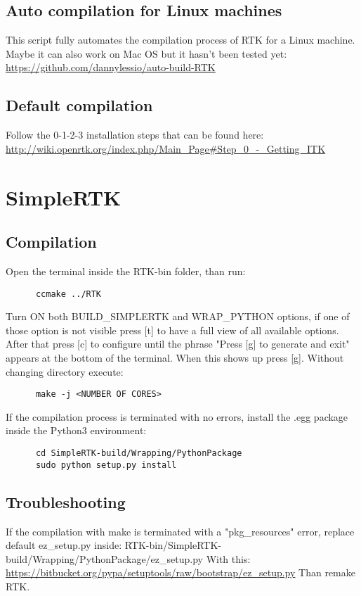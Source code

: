 \documentclass[a4paper,11pt, oneside]{article}
\begin{document}
    \subsection{  Auto compilation for Linux machines}
    
      \par This script fully automates the compilation process of RTK for a Linux machine. Maybe it can also work on Mac OS but it hasn't been tested yet:
    \newline
    \url{https://github.com/dannylessio/auto-build-RTK}
    
    \subsection{ Default compilation }
     Follow the 0-1-2-3 installation steps that can be found here:
    \newline
    \url{http://wiki.openrtk.org/index.php/Main_Page#Step_0_-_Getting_ITK}
    
    \section{ SimpleRTK }
    \subsection{ Compilation }
    Open the terminal inside the RTK-bin folder, than run:
    \begin{lstlisting}
      ccmake ../RTK
    \end{lstlisting}
    Turn ON both BUILD\_SIMPLERTK and WRAP\_PYTHON options, if one of those option is not visible press [t] to have a full view of all available options. After that press [c] to configure until the phrase "Press [g] to generate and exit" appears at the bottom of the terminal. When this shows up press [g].
    Without changing directory execute:
    \begin{lstlisting}
      make -j <NUMBER OF CORES>
    \end{lstlisting}
    If the compilation process is terminated with no errors, install the .egg package inside the Python3 environment:
    \begin{lstlisting}
      cd SimpleRTK-build/Wrapping/PythonPackage
      sudo python setup.py install
    \end{lstlisting}
    
    \subsection{Troubleshooting}
    If the compilation with make is terminated with a "pkg\_resources" error, replace default ez\_setup.py inside:
    \newline
    RTK-bin/SimpleRTK-build/Wrapping/PythonPackage/ez\_setup.py
    \newline\newline
    With this:
    \newline
    \url{https://bitbucket.org/pypa/setuptools/raw/bootstrap/ez\_setup.py}
    \newline\newline
    Than remake RTK.
    
\end{document}
